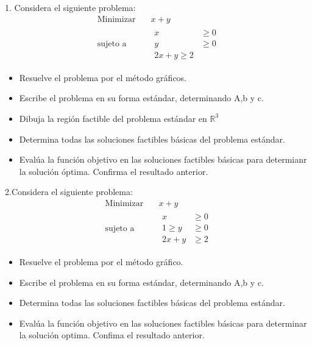 \documentclass{article}
\begin{document}
1. Considera el siguiente problema:
\begin{equation*}
  \begin{aligned}
    \text{Minimizar}\quad & x+y\\
    \text{sujeto a}\quad  &
     \begin{aligned}
      x & \geq 0 \\
      y & \geq 0 \\
      2x+y \geq 2
     \end{aligned}
  \end{aligned}
\end{equation*}
\begin{itemize}
\item Resuelve el problema por el método gráficos.
\item Escribe el problema en su forma estándar, determinando A,b y c.
\item Dibuja la región factible del problema estándar en $\mathbb{R}^3$
\item Determina todas las soluciones factibles básicas del problema estándar.
\item Evalúa la función objetivo en las soluciones factibles básicas para determianr la solución óptima. Confirma el resultado anterior.
\end{itemize}

2.Considera el siguiente  problema:
\begin{equation*}
  \begin{aligned}
    \text{Minimizar}\quad  & x+y \\
    \text{sujeto a}\quad  &
  \begin{aligned}
    x & \geq 0\\ 
 1 \geq  y & \geq 0\\
2x + y & \geq 2
  \end{aligned}
  \end{aligned}
\end{equation*}

\begin{itemize}
\item Resuelve el problema por el método gráfico.
\item  Escribe el problema en su forma estándar, determinando A,b y c.
\item Determina todas las soluciones factibles básicas del problema estándar.
  \item Evalúa la función objetivo en las soluciones factibles básicas para determinar la solución optima. Confima el resultado anterior.
  \end{itemize}
\end{document}
